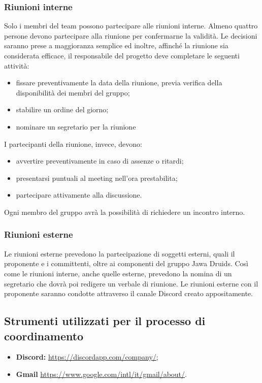 \subsubsection{Riunioni interne}\label{4.1.3.1}
Solo i membri del team possono partecipare alle riunioni interne.
Almeno quattro persone devono partecipare alla riunione per confermarne la validità.
Le decisioni saranno prese a maggioranza semplice ed inoltre, affinché la riunione sia considerata efficace, il responsabile del progetto deve completare le seguenti attività:
\begin{itemize}
\item fissare preventivamente la data della riunione, previa verifica della disponibilità dei membri del gruppo;
\item stabilire un ordine del giorno;
\item nominare un segretario per la riunione
\end{itemize}
I partecipanti della riunione, invece, devono:
\begin{itemize}
	\item avvertire preventivamente in caso di assenze o ritardi;
	\item presentarsi puntuali al meeting nell'ora prestabilita;
	\item partecipare attivamente alla discussione.
\end{itemize}
Ogni membro del gruppo avrà la possibilità di richiedere un incontro interno.
\subsubsection{Riunioni esterne}\label{4.1.3.2}
Le riunioni esterne prevedono la partecipazione di soggetti esterni, quali il proponente e i committenti, oltre ai componenti del gruppo Jawa Druids.
Così come le riunioni interne, anche quelle esterne, prevedono la nomina di un segretario che dovrà poi redigere un verbale di riunione.
Le riunioni esterne con il proponente saranno condotte attraverso il canale Discord creato appositamente.
\subsection{Strumenti utilizzati per il processo di coordinamento}\label{4.1.4}
\begin{itemize}
	\item \textbf{Discord:} \url{https://discordapp.com/company/};
	\item \textbf{Gmail} \url{https://www.google.com/intl/it/gmail/about/}.
\end{itemize}
